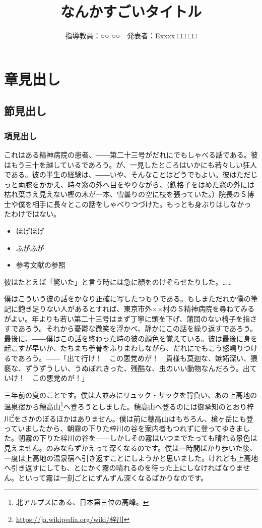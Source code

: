 



\title{なんかすごいタイトル}
\author{指導教員：○○ ○○　発表者：Exxxx □□ □□}
\maketitle

\section{章見出し}

\subsection{節見出し}

\subsubsection{項見出し}

これはある精神病院の患者、――第二十三号がだれにでもしゃべる話である。彼はもう三十を越しているであろう。が、一見したところはいかにも若々しい狂人である。彼の半生の経験は、――いや、そんなことはどうでもよい。彼はただじっと両膝をかかえ、時々窓の外へ目をやりながら、（鉄格子をはめた窓の外には枯れ葉さえ見えない樫の木が一本、雪曇りの空に枝を張っていた。）院長のＳ博士や僕を相手に長々とこの話をしゃべりつづけた。もっとも身ぶりはしなかったわけではない。
\begin{itemize}
  \item ほげほげ
  \item ふがふが
  \item 参考文献の参照\cite{kappa}
\end{itemize}
彼はたとえば「驚いた」と言う時には急に顔をのけぞらせたりした。……

僕はこういう彼の話をかなり正確に写したつもりである。もしまただれか僕の筆記に飽き足りない人があるとすれば、東京市外××村のＳ精神病院を尋ねてみるがよい。年よりも若い第二十三号はまず丁寧に頭を下げ、蒲団のない椅子を指さすであろう。それから憂鬱な微笑を浮かべ、静かにこの話を繰り返すであろう。最後に、――僕はこの話を終わった時の彼の顔色を覚えている。彼は最後に身を起こすが早いか、たちまち拳骨をふりまわしながら、だれにでもこう怒鳴りつけるであろう。――「出て行け！　この悪党めが！　貴様も莫迦な、嫉妬深い、猥褻な、ずうずうしい、うぬぼれきった、残酷な、虫のいい動物なんだろう。出ていけ！　この悪党めが！」

三年前の夏のことです。僕は人並みにリュック・サックを背負い、あの上高地の温泉宿から穂高山\footnote{北アルプスにある、日本第三位の高峰。}へ登ろうとしました。穂高山へ登るのには御承知のとおり梓川\footnote{\url{https://ja.wikipedia.org/wiki/梓川}}をさかのぼるほかはありません。僕は前に穂高山はもちろん、槍ヶ岳にも登っていましたから、朝霧の下りた梓川の谷を案内者もつれずに登ってゆきました。朝霧の下りた梓川の谷を――しかしその霧はいつまでたっても晴れる景色は見えません。のみならずかえって深くなるのです。僕は一時間ばかり歩いた後、一度は上高地の温泉宿へ引き返すことにしようかと思いました。けれども上高地へ引き返すにしても、とにかく霧の晴れるのを待った上にしなければなりません。といって霧は一刻ごとにずんずん深くなるばかりなのです。

